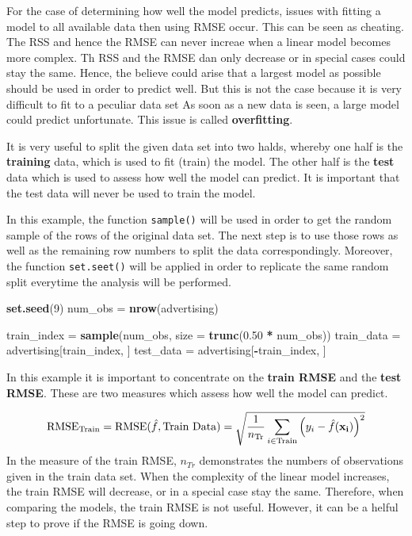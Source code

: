 \documentclass[]{report}
\newenvironment{Shaded}{\begin{snugshade}}{\end{snugshade}}
\newcommand{\KeywordTok}[1]{\textcolor[rgb]{0.13,0.29,0.53}{\textbf{#1}}}
\newcommand{\DataTypeTok}[1]{\textcolor[rgb]{0.13,0.29,0.53}{#1}}
\newcommand{\DecValTok}[1]{\textcolor[rgb]{0.00,0.00,0.81}{#1}}
\newcommand{\FloatTok}[1]{\textcolor[rgb]{0.00,0.00,0.81}{#1}}
\newcommand{\StringTok}[1]{\textcolor[rgb]{0.31,0.60,0.02}{#1}}
\newcommand{\OperatorTok}[1]{\textcolor[rgb]{0.81,0.36,0.00}{\textbf{#1}}}
\newcommand{\NormalTok}[1]{#1}
\begin{document}
For the case of determining how well the model predicts, issues with
fitting a model to all available data then using RMSE occur. This can be
seen as cheating. The RSS and hence the RMSE can never increae when a
linear model becomes more complex. Th RSS and the RMSE dan only decrease
or in special cases could stay the same. Hence, the believe could arise
that a largest model as possible should be used in order to predict
well. But this is not the case because it is very difficult to fit to a
peculiar data set As soon as a new data is seen, a large model could
predict unfortunate. This issue is called \textbf{overfitting}.

It is very useful to split the given data set into two halds, whereby
one half is the \textbf{training} data, which is used to fit (train) the
model. The other half is the \textbf{test} data which is used to assess
how well the model can predict. It is important that the test data will
never be used to train the model.

In this example, the function \texttt{sample()} will be used in order to
get the random sample of the rows of the original data set. The next
step is to use those rows as well as the remaining row numbers to split
the data correspondingly. Moreover, the function \texttt{set.seet()}
will be applied in order to replicate the same random split everytime
the analysis will be performed.

\begin{Shaded}
\begin{Highlighting}[]
\KeywordTok{set.seed}\NormalTok{(}\DecValTok{9}\NormalTok{)}
\NormalTok{num_obs =}\StringTok{ }\KeywordTok{nrow}\NormalTok{(advertising)}

\NormalTok{train_index =}\StringTok{ }\KeywordTok{sample}\NormalTok{(num_obs, }\DataTypeTok{size =} \KeywordTok{trunc}\NormalTok{(}\FloatTok{0.50} \OperatorTok{*}\StringTok{ }\NormalTok{num_obs))}
\NormalTok{train_data =}\StringTok{ }\NormalTok{advertising[train_index, ]}
\NormalTok{test_data =}\StringTok{ }\NormalTok{advertising[}\OperatorTok{-}\NormalTok{train_index, ]}
\end{Highlighting}
\end{Shaded}

In this example it is important to concentrate on the \textbf{train
RMSE} and the \textbf{test RMSE}. These are two measures which assess
how well the model can predict.

\[
\text{RMSE}_{\text{Train}} = \text{RMSE}(\hat{f}, \text{Train Data}) = \sqrt{\frac{1}{n_{\text{Tr}}}\displaystyle\sum_{i \in \text{Train}}^{}\left(y_i - \hat{f}(\bf{x}_i)\right)^2}
\] In the measure of the train RMSE, \(n_{Tr}\) demonstrates the numbers
of observations given in the train data set. When the complexity of the
linear model increases, the train RMSE will decrease, or in a special
case stay the same. Therefore, when comparing the models, the train RMSE
is not useful. However, it can be a helful step to prove if the RMSE is
going down.
\end{document}
